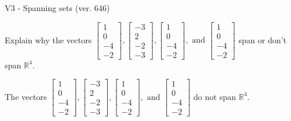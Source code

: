 \begin{exercise}
  \begin{exerciseTitle}V3 - Spanning sets (ver. 646)\end{exerciseTitle}
  \begin{exerciseStatement}
    Explain why the vectors \(\left[\begin{array}{r}
1 \\
0 \\
-4 \\
-2
\end{array}\right] , \left[\begin{array}{r}
-3 \\
2 \\
-2 \\
-3
\end{array}\right] , \left[\begin{array}{r}
1 \\
0 \\
-4 \\
-2
\end{array}\right] , \text{ and } \left[\begin{array}{r}
1 \\
0 \\
-4 \\
-2
\end{array}\right]\) span or don't span \(\mathbb{R}^4\). 
	


  \end{exerciseStatement}
  \begin{exerciseAnswer}
   The vectors \(\left[\begin{array}{r}
1 \\
0 \\
-4 \\
-2
\end{array}\right] , \left[\begin{array}{r}
-3 \\
2 \\
-2 \\
-3
\end{array}\right] , \left[\begin{array}{r}
1 \\
0 \\
-4 \\
-2
\end{array}\right] , \text{ and } \left[\begin{array}{r}
1 \\
0 \\
-4 \\
-2
\end{array}\right]\) 
  	 do not  
	span \(\mathbb{R}^4\).
  


  \end{exerciseAnswer}
\end{exercise}